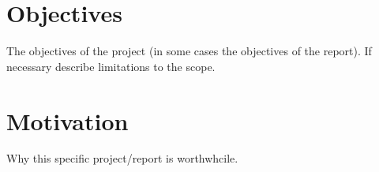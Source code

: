 
\section{Objectives}

The objectives of the project (in some cases the objectives of the report). If necessary describe limitations to the scope.

\section{Motivation}

Why this specific project/report is worthwhcile.

